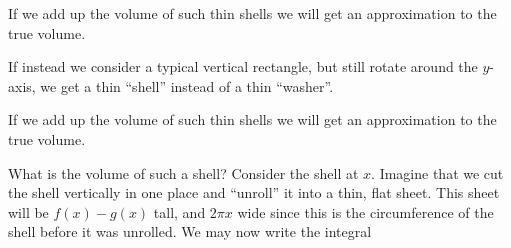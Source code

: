 \documentclass{ximera}
\begin{document}
If we add up the volume of such thin shells we will get an
approximation to the true volume.
\begin{image}
\end{image}


If instead we consider a typical vertical rectangle, but still rotate
around the $y$-axis, we get a thin ``shell'' instead of a thin
``washer''. 



If we add up the volume of such thin shells we will get an
approximation to the true volume.


What is the volume of such a shell?  Consider the shell at $x$.
Imagine that we cut the shell vertically in one place and ``unroll''
it into a thin, flat sheet. This sheet will be $f(x)-g(x)$ tall, and
$2\pi x$ wide since this is the circumference of the shell before it
was unrolled.  We may now write the integral
\end{document}
